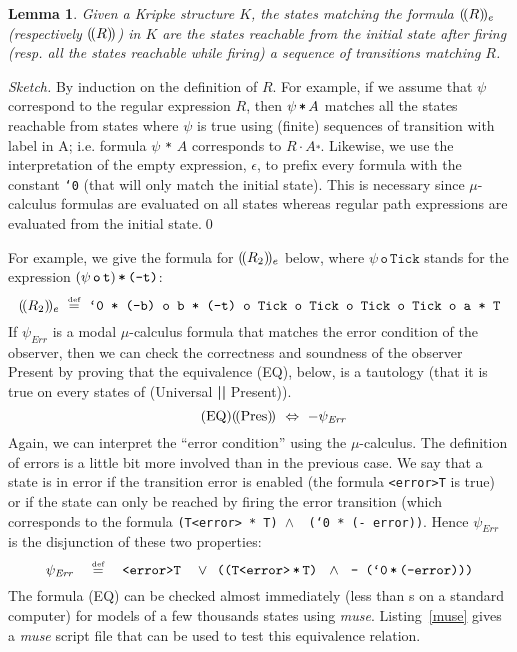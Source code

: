 \documentclass[a4paper]{scrartcl}
\def\code#1{\textsf{\small\bfseries #1}}
\def\vars#1{\textsf{\small #1}}
\newcommand{\interp}[2][{}]{(\kern-.5mm({#2})\kern-.5mm)_{#1}}
\newcommand{\eqdef}{\ensuremath{\overset{\text{\tiny def}}{=}}}
\newcommand{\kleene}{\ensuremath{\mathclose{\overset{*}{\ }}}}
\newcommand{\ltl}[1]{\texttt{#1}}
\newcommand{\ltland}{\,\ensuremath{\wedge}\,}\newcommand{\ltlo}{\,\ensuremath{\text{\texttt{o}}}\,}\newcommand{\ltls}{\,\ensuremath{\text{\texttt{*}}}\,}\newcommand{\ltlU}{\,\ensuremath{\text{\texttt{U}}}\,}\newcommand{\ltlwand}{\,\ensuremath{\text{\texttt{-*}}}\,}\newcommand{\ltlor}{\,\ensuremath{\vee}\,}\newcommand{\kirc}{\mathrel{\circ}}
\newtheorem{lemma}{Lemma}
\begin{document}
\begin{lemma}
  Given a Kripke structure $K$, the states matching the formula
  $\interp[e]{R}$ (respectively $\interp{R}$\/) in $K$ are the states
  reachable from the initial state after firing (resp. all the states
  reachable while firing) a sequence of transitions matching $R$.
\end{lemma}
\begin{proof}[Sketch]
  By induction on the definition of $R$. For example, if we assume
  that $\psi$ correspond to the regular expression $R$, then $\psi
  \ltls A$ matches all the states reachable from states where $\psi$
  is true using (finite) sequences of transition with label in A;
  i.e. formula $\psi$ \ltl{*} $A$ corresponds to $R \cdot A\kleene$.
  Likewise, we use the interpretation of the empty expression,
  $\epsilon$, to prefix every formula with the constant \ltl{`0} (that
  will only match the initial state). This is necessary since
  $\mu$-calculus formulas are evaluated on all states whereas regular
  path expressions are evaluated from the initial state.\qed
\end{proof}

For example, we give the formula for $\interp[e]{R_2}$ below, where
$\psi\,\ltl{o}\,\ltl{Tick}$ stands for the expression
$(\psi\ltl{\,o\,t})\ltl{\,*\,(-t)}$:
\[
\interp[e]{R_2}  \ \eqdef\  \ltl{`0 * (-b) o b * (-t) o Tick o Tick o Tick o Tick o
  a * T}
\]
If $\psi_\mathit{Err}$ is a modal $\mu$-calculus formula that matches
the error condition of the observer, then we can check the correctness
and soundness of the observer \vars{Present} by proving that the
equivalence (EQ), below, is a tautology (that it is true on every
states of (\vars{Universal} \code{||} \vars{Present})).
\[
\tag{EQ}
\interp{\mathrm{Pres}} \ \Leftrightarrow\ - \psi_\mathit{Err}
\]
Again, we can interpret the ``error condition'' using the
$\mu$-calculus.  The definition of errors is a little bit more
involved than in the previous case. We say that a state is in error if
the transition \vars{error} is enabled (the formula \ltl{<error>T} is
true) or if the state can only be reached by firing the \vars{error}
transition (which corresponds to the formula
\ltl{(T<error>\,*\,T)\ltland\,(`0\,*\,(- error))}. Hence
$\psi_\mathit{Err}$ is the disjunction of these two properties:
\[
\psi_\mathit{Err} \quad \eqdef\quad \ltl{<error>T \ \ltlor\
  ((T<error>\,*\,T) \,\ltland\, - (`0\,*\,(-error)))}
\]
The formula (EQ) can be checked almost immediately (less than
\unit[1]{s} on a standard computer) for models of a few thousands
states using \emph{muse}. Listing~\ref{muse} gives a \emph{muse}
script file that can be used to test this equivalence relation.
\end{document}
